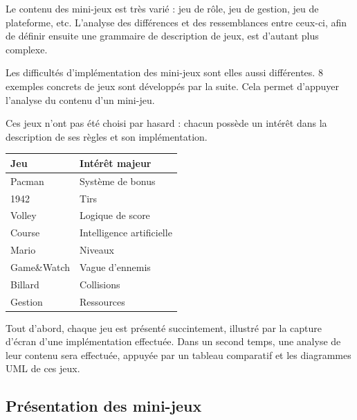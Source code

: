 
Le contenu des mini-jeux est très varié : jeu de rôle, jeu de gestion, jeu de plateforme, etc.
L'analyse des différences et des ressemblances entre ceux-ci, afin de définir ensuite une grammaire de description de jeux, est d'autant plus complexe.

Les difficultés d'implémentation des mini-jeux sont elles aussi différentes.
8 exemples concrets de jeux sont développés par la suite.
Cela permet d'appuyer l'analyse du contenu d'un mini-jeu.

Ces jeux n'ont pas été choisi par hasard : chacun possède un intérêt dans la description de ses règles et son implémentation. 


\begin{center}
\begin{tabular}{l|l}
 Jeu & Intérêt majeur \\
 \hline
 Pacman & Système de bonus \\
 1942 & Tirs \\
 Volley & Logique de score \\
 Course & Intelligence artificielle \\
 Mario & Niveaux \\
 Game\&Watch & Vague d'ennemis \\
 Billard & Collisions \\
 Gestion & Ressources \\
\end{tabular}
\end{center}

\vspace{0.5cm}

Tout d'abord, chaque jeu est présenté succintement, illustré par la capture d'écran d'une implémentation effectuée.
Dans un second temps, une analyse de leur contenu sera effectuée, appuyée par un tableau comparatif et les diagrammes UML de ces jeux.

\clearpage

\subsection{Présentation des mini-jeux}


